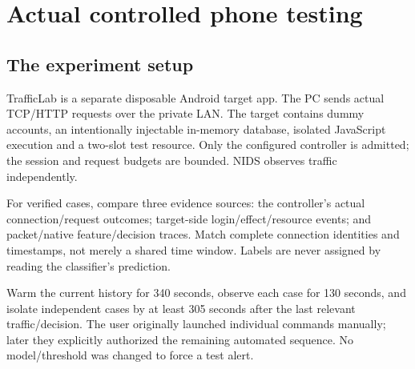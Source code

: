 \documentclass[11pt,a4paper,oneside]{report}
\begin{document}
\chapter{Actual controlled phone testing}
\section{The experiment setup}
TrafficLab is a separate disposable Android target app. The PC sends actual TCP/HTTP requests over the private LAN. The target contains dummy accounts, an intentionally injectable in-memory database, isolated JavaScript execution and a two-slot test resource. Only the configured controller is admitted; the session and request budgets are bounded. NIDS observes traffic independently.

For verified cases, compare three evidence sources: the controller's actual connection/request outcomes; target-side login/effect/resource events; and packet/native feature/decision traces. Match complete connection identities and timestamps, not merely a shared time window. Labels are never assigned by reading the classifier's prediction.

Warm the current history for 340 seconds, observe each case for 130 seconds, and isolate independent cases by at least 305 seconds after the last relevant traffic/decision. The user originally launched individual commands manually; later they explicitly authorized the remaining automated sequence. No model/threshold was changed to force a test alert.
\end{document}
